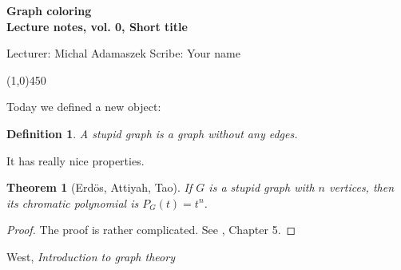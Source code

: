 \documentclass[a4paper]{article}
\theoremstyle{plain}
\newtheorem{theorem}[lemma]{Theorem}
\newtheorem{definition}[lemma]{Definition}
\theoremstyle{myremark}
\newcommand{\LECTURENUMBER}{0}
\newcommand{\LECTURETITLE}{Short title}
\newcommand{\LECTURESCRIBE}{Your name}
\begin{document}
\thispagestyle{empty}

\begin{center}
	{\Large\bf Graph coloring}\\
	{\bf Lecture notes, vol. \LECTURENUMBER, \LECTURETITLE}\\
\end{center}
Lecturer: Michal Adamaszek \hfill Scribe: \LECTURESCRIBE
\begin{center}
\line(1,0){450}
\end{center}


Today we defined a new object:
\begin{definition}
A \emph{stupid graph} is a graph without any edges.
\end{definition}

It has really nice properties.
\begin{theorem}[Erd\"os, Attiyah, Tao]
If $G$ is a stupid graph with $n$ vertices, then its chromatic polynomial is $P_G(t)=t^n$.
\end{theorem}
\begin{proof}
The proof is rather complicated. See \cite{west}, Chapter 5.
\end{proof}



\begin{thebibliography}{9}
 West, \textit{Introduction to graph theory}

\end{thebibliography}
\end{document}
